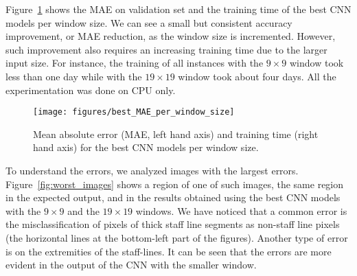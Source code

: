 \documentclass[conference]{IEEEtran}
\begin{document}
Figure~\ref{fig:best_window} shows the MAE on validation set and
the training time of the best CNN models per window size. We can see a
small but consistent accuracy improvement, or MAE reduction, as the
window size is incremented. However, such improvement also requires an
increasing training time due to the larger input size. 
For instance, the training of all instances with the $9\times 9$
window took less than one day while with  the $19\times 19$ window
took about four days. All the experimentation was done on CPU only.


\begin{figure}[htb]
\centering
\texttt{[image: figures/best\_MAE\_per\_window\_size]}
\caption{Mean absolute error (MAE, left hand axis) and 
training time (right hand axis) for the best CNN models 
per window size.}
\label{fig:best_window} 
\end{figure}

To understand the errors, we analyzed images with the largest
errors. Figure~\ref{fig:worst_images} shows a region of one of such
images, the same region in the expected output, and in the results
obtained using the best CNN models with the $9\times9$ and the
$19\times19$ windows. We have noticed that a common error is the
misclassification of pixels of thick staff line segments as non-staff
line pixels (the horizontal lines at the bottom-left part of the
figures). Another type of error is on the extremities of the
staff-lines.
It can be seen that the errors are more evident in the output of the
CNN with the smaller window.

\begin{figure*}[!t]
\centering
{}
\hspace{3em}
\\

\hspace{3em}
\caption{Resulting image analysis: (a) region of an image for which
  CNNs obtained worst accuracy, (b) same region in the expected output
  image, and same region in the outputs produced by the best CNN
  models with (c) $9\times9$ and (d) $19\times 19$ windows.}
\label{fig:worst_images}
\end{figure*}
\end{document}

